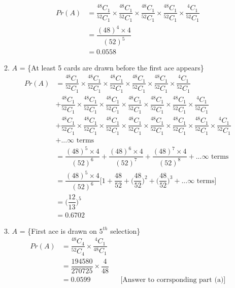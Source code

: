\documentclass{article}
\begin{document}
\begin{enumerate}
\begin{enumerate}
			\begin{align*}
				Pr(A) &= \dfrac{^{48}C_{1}}{^{52}C_{1}} \times \dfrac{^{48}C_{1}}{^{52}C_{1}} \times \dfrac{^{48}C_{1}}{^{52}C_{1}} \times \dfrac{^{48}C_{1}}{^{52}C_{1}} \times \dfrac{^{4}C_{1}}{^{52}C_{1}}\\
				&= \dfrac{(48)^{4} \times 4}{(52)^{5}}\\
				&= \mathbf{0.0558}
			\end{align*}
			\item
			$A$ = \{At least 5 cards are drawn before the first ace appears\}
			\begin{align*}
			Pr(A) &= \dfrac{^{48}C_{1}}{^{52}C_{1}} \times \dfrac{^{48}C_{1}}{^{52}C_{1}} \times \dfrac{^{48}C_{1}}{^{52}C_{1}} \times \dfrac{^{48}C_{1}}{^{52}C_{1}} \times \dfrac{^{48}C_{1}}{^{52}C_{1}} \times \dfrac{^{4}C_{1}}{^{52}C_{1}}\\ &+ \dfrac{^{48}C_{1}}{^{52}C_{1}} \times \dfrac{^{48}C_{1}}{^{52}C_{1}} \times \dfrac{^{48}C_{1}}{^{52}C_{1}} \times \dfrac{^{48}C_{1}}{^{52}C_{1}} \times \dfrac{^{48}C_{1}}{^{52}C_{1}} \times			 \dfrac{^{48}C_{1}}{^{52}C_{1}} \times \dfrac{^{4}C_{1}}{^{52}C_{1}}\\ &+ \dfrac{^{48}C_{1}}{^{52}C_{1}} \times \dfrac{^{48}C_{1}}{^{52}C_{1}} \times \dfrac{^{48}C_{1}}{^{52}C_{1}} \times \dfrac{^{48}C_{1}}{^{52}C_{1}} \times \dfrac{^{48}C_{1}}{^{52}C_{1}} \times \dfrac{^{48}C_{1}}{^{52}C_{1}} \times \dfrac{^{48}C_{1}}{^{52}C_{1}} \times \dfrac{^{4}C_{1}}{^{52}C_{1}}\\ &+ ... \infty\text{ terms}\\
			&= \dfrac{(48)^{5} \times 4}{(52)^{6}} + \dfrac{(48)^{6} \times 4}{(52)^{7}} + \dfrac{(48)^{7} \times 4}{(52)^{8}} + ... \infty\text{ terms}\\
			&= \dfrac{(48)^{5} \times 4}{(52)^{6}} \Big[1 + \dfrac{48}{52} + \Big(\dfrac{48}{52}\Big) ^{2} + \Big(\dfrac{48}{52}\Big) ^{3} + ... \infty\text{ terms}\Big]\\
			&= \Big(\dfrac{12}{13}\Big)^{5}\\
			&= \mathbf{0.6702}
			\end{align*}
			
			\item $A$ = \{First ace is drawn on $5^{th}$ selection\}
			\begin{align*}
				Pr(A) &= \dfrac{^{48}C_{4}}{^{52}C_{4}} \times \dfrac{^{4}C_{1}}{^{48}C_{1}}\\
					  &= \dfrac{194580}{270725} \times \dfrac{4}{48}\\
					  &= \mathbf{0.0599} && \text{[Answer to corrsponding part (a)]}
			\end{align*}
			

\end{enumerate}
\end{enumerate}
\end{document}
